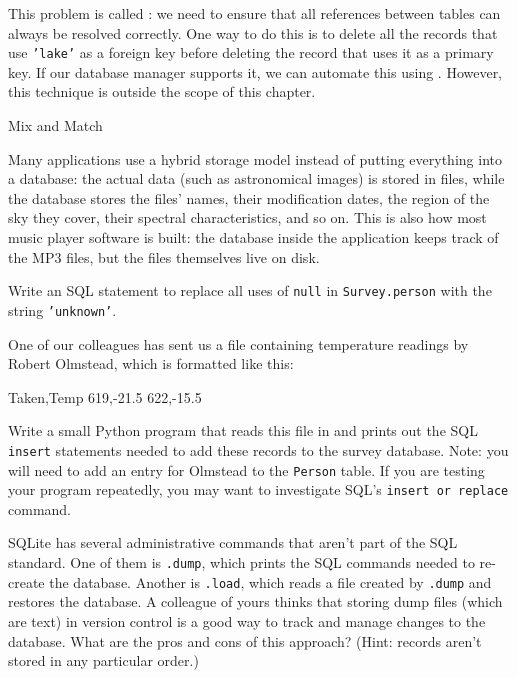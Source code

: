 \documentclass{book}
\begin{document}
This problem is called : we need to ensure that all references between tables can
always be resolved correctly. One way to do this is to delete all the
records that use \texttt{'lake'} as a foreign key before deleting the
record that uses it as a primary key. If our database manager supports
it, we can automate this using . However, this technique is outside the scope of this chapter.

\begin{swcbox}{Mix and Match}

Many applications use a hybrid storage model instead of putting
everything into a database: the actual data (such as astronomical
images) is stored in files, while the database stores the files' names,
their modification dates, the region of the sky they cover, their
spectral characteristics, and so on. This is also how most music player
software is built: the database inside the application keeps track of
the MP3 files, but the files themselves live on disk.

\end{swcbox}

\begin{challenge}
  Write an SQL statement to replace all uses of \texttt{null} in
  \texttt{Survey.person} with the string \texttt{'unknown'}.
\end{challenge}

\begin{challenge}
  One of our colleagues has sent us a  file
  containing temperature readings by Robert Olmstead, which is formatted
  like this:

\begin{VerbFile}
Taken,Temp
619,-21.5
622,-15.5
\end{VerbFile}

  Write a small Python program that reads this file in and prints out
  the SQL \texttt{insert} statements needed to add these records to the
  survey database. Note: you will need to add an entry for Olmstead to
  the \texttt{Person} table. If you are testing your program repeatedly,
  you may want to investigate SQL's \texttt{insert or replace} command.
\end{challenge}

\begin{challenge}
  SQLite has several administrative commands that aren't part of the SQL
  standard. One of them is \texttt{.dump}, which prints the SQL commands
  needed to re-create the database. Another is \texttt{.load}, which
  reads a file created by \texttt{.dump} and restores the database. A
  colleague of yours thinks that storing dump files (which are text) in
  version control is a good way to track and manage changes to the
  database. What are the pros and cons of this approach? (Hint: records
  aren't stored in any particular order.)
\end{challenge}
\end{document}
